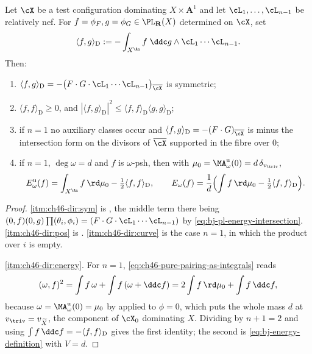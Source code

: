 \begin{proposition}
\label{prop:ch46-dirichlet-vertical}
Let $\cX$ be a test configuration dominating $X\times\mathbf A^1$ and
let $\cL_1,\dots,\cL_{n-1}$ be relatively nef.  For
$f=\phi_F,g=\phi_G\in\PL_{\mathbf R}(X)$ determined on $\cX$, set
\[
 \langle f,g\rangle_{\mathrm D}
 :=-\int_{X^{\An}}f\;\ddc g\wedge\cL_1\cdots\cL_{n-1}.
\]
Then:
\begin{enumerate}
\item\label{itm:ch46-dir:sym}
      $\langle f,g\rangle_{\mathrm D}
        =-\bigl(F\cdot G\cdot\cL_1\cdots\cL_{n-1}\bigr)_{\overline\cX}$
      is symmetric;
\item\label{itm:ch46-dir:pos}
      $\langle f,f\rangle_{\mathrm D}\ge0$, and
      $|\langle f,g\rangle_{\mathrm D}|^2
        \le\langle f,f\rangle_{\mathrm D}\langle g,g\rangle_{\mathrm D}$;
\item\label{itm:ch46-dir:curve}
      if $n=1$ no auxiliary classes occur and
      $\langle f,g\rangle_{\mathrm D}=-(F\cdot G)_{\overline\cX}$ is
      minus the intersection form on the divisors of $\overline\cX$
      supported in the fibre over $0$;
\item\label{itm:ch46-dir:energy}
      if $n=1$, $\deg\omega=d$ and $f$ is $\omega$-psh, then with
      $\mu_0=\MA^{\mathrm u}_\omega(0)=d\,\delta_{v_{\triv}}$,
      \[
       E^{\mathrm u}_\omega(f)
       =\int_{X^{\An}}f\,\rd\mu_0-\tfrac12\langle f,f\rangle_{\mathrm D},
       \qquad
       E_\omega(f)=\frac1d\Bigl(\int f\,\rd\mu_0
                    -\tfrac12\langle f,f\rangle_{\mathrm D}\Bigr).
      \]
\end{enumerate}
\end{proposition}

\begin{proof}
\cref{itm:ch46-dir:sym} is , the middle term there
being $(0,f)(0,g)\prod(\theta_i,\phi_i)=(F\cdot G\cdot\cL_1\cdots\cL_{n-1})$
by \eqref{eq:bj-pl-energy-intersection}.
\cref{itm:ch46-dir:pos} is .
\cref{itm:ch46-dir:curve} is the case $n=1$, in which the product over
$i$ is empty.

\cref{itm:ch46-dir:energy}.  For $n=1$,
\eqref{eq:ch46-pure-pairing-as-integrals} reads
\[
 (\omega,f)^2=\int f\,\omega+\int f\,(\omega+\ddc f)
 =2\int f\,\rd\mu_0+\int f\,\ddc f,
\]
because $\omega=\MA^{\mathrm u}_\omega(0)=\mu_0$ by
 applied to $\phi=0$, which puts the whole
mass $d$ at $v_{\triv}=v_{\widetilde X}$, the component of $\cX_0$
dominating $X$.  Dividing by $n+1=2$ and using
$\int f\,\ddc f=-\langle f,f\rangle_{\mathrm D}$ gives the first identity;
the second is \eqref{eq:bj-energy-definition} with $V=d$.
\end{proof}

